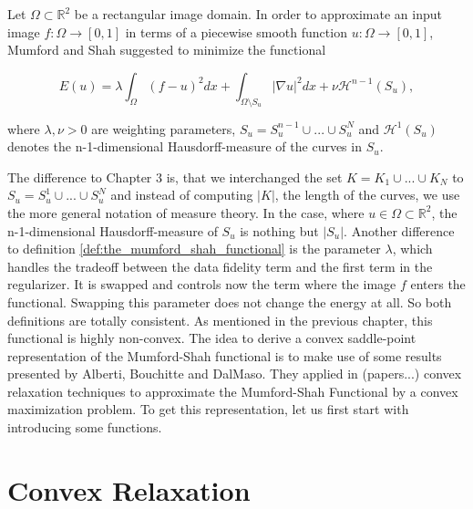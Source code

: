 \begin{definition} %
\label{def:the_mumford_shah_functional_revisited}

    Let $\Omega \subset \mathbb{R}^{2}$ be a rectangular image domain. In order to approximate an input image $f: \Omega \longrightarrow [0, 1]$ in terms of a piecewise smooth function $u: \Omega \longrightarrow [0, 1]$, Mumford and Shah suggested to minimize the functional
        
        \begin{equation}
            E(u) = \lambda \int_{\Omega} (f - u)^{2} dx + \int_{\Omega \setminus S_{u}} |\nabla u|^{2} dx + \nu \mathcal{H}^{n-1}(S_{u}),
        \label{eq:the_mumford_shah_functional_revisited}
        \end{equation}
    
    where $\lambda, \nu > 0$ are weighting parameters, $S_{u} = S^{n-1}_{u} \cup ... \cup S^{N}_{u}$ and $\mathcal{H}^{1}(S_{u})$ denotes the n-1-dimensional Hausdorff-measure of the curves in $S_{u}$.

\end{definition}

The difference to Chapter 3 is, that we interchanged the set $K = K_{1} \cup ... \cup K_{N}$ to $S_{u} = S^{1}_{u} \cup ... \cup S^{N}_{u}$ and instead of computing $|K|$, the length of the curves, we use the more general notation of measure theory. In the case, where $u \in \Omega \subset \mathbb{R}^{2}$, the n-1-dimensional Hausdorff-measure of $S_{u}$ is nothing but $|S_{u}|$. Another difference to definition \ref{def:the_mumford_shah_functional} is the parameter $\lambda$, which handles the tradeoff between the data fidelity term and the first term in the regularizer. It is swapped and controls now the term where the image $f$ enters the functional. Swapping this parameter does not change the energy at all. So both definitions are totally consistent. As mentioned in the previous chapter, this functional is highly non-convex. The idea to derive a convex saddle-point representation of the Mumford-Shah functional is to make use of some results presented by Alberti, Bouchitte and DalMaso. They applied in (papers...) convex relaxation techniques to approximate the Mumford-Shah Functional by a convex maximization problem. To get this representation, let us first start with introducing some functions.%

\section{Convex Relaxation} %
\label{sec:convex_relaxation}

